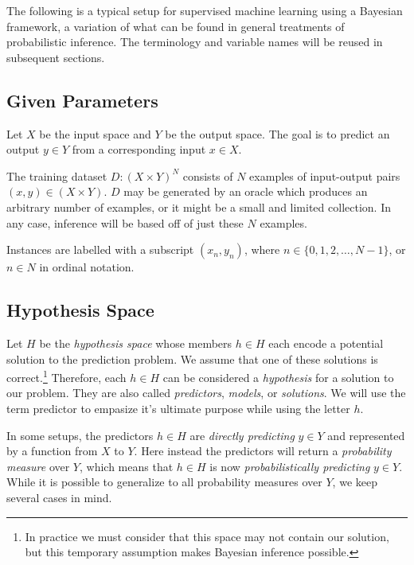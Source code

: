 \documentclass[twoside]{article}
\begin{document}
The following is a typical setup for supervised machine learning using a Bayesian framework, a variation of what can be found in general treatments of probabilistic inference\cite{pythonbayes}\cite{gelmanbayes}\cite{blais}. The terminology and variable names will be reused in subsequent sections.

\subsection{Given Parameters}

Let \(X\) be the input space and \(Y\) be the output space. The goal is to predict an output \(y \in Y\) from a corresponding input \(x \in X\).

The training dataset \(D: (X \times Y)^N\) consists of \(N\) examples of input-output pairs \((x, y) \in (X \times Y) \). \(D\) may be generated by an oracle which produces an arbitrary number of examples, or it might be a small and limited collection. In any case, inference will be based off of just these \(N\) examples.

Instances are labelled with a subscript \((x_n, y_n)\), where \(n \in \{0, 1, 2,\ldots,N-1\}\), or \(n \in N\) in ordinal notation.

\subsection{Hypothesis Space}

Let \(H\) be the \textit{hypothesis space} whose members \(h \in H\) each encode a potential solution to the prediction problem. We assume that one of these solutions is correct.\footnote{In practice we must consider that this space may not contain our solution, but this temporary assumption makes Bayesian inference possible.} Therefore, each \(h \in H\) can be considered a \textit{hypothesis} for a solution to our problem. They are also called \textit{predictors}, \textit{models}, or \textit{solutions}. We will use the term predictor to empasize it's ultimate purpose while using the letter \(h\).

In some setups, the predictors \(h \in H\) are \textit{directly predicting} \(y \in Y\) and represented by a function from \(X\) to \(Y\). Here instead the predictors will return a \textit{probability measure} over \(Y\), which means that \(h \in H\) is now \textit{probabilistically predicting} \(y \in Y\). While it is possible to generalize to all probability measures over \(Y\), we keep several cases in mind.
\end{document}
